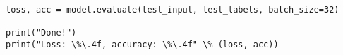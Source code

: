 \begin{verbatim}
loss, acc = model.evaluate(test_input, test_labels, batch_size=32)

print("Done!")
print("Loss: \%\.4f, accuracy: \%\.4f" \% (loss, acc))
\end{verbatim}